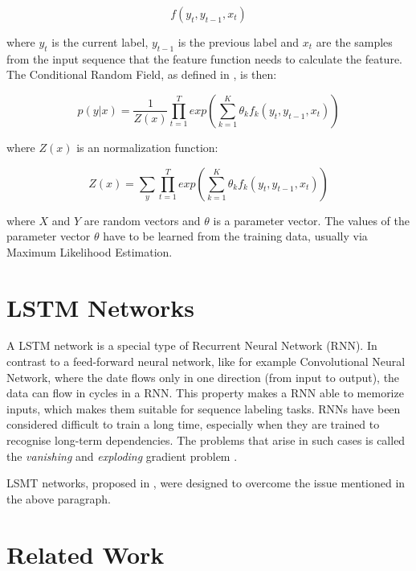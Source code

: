 \documentclass[12pt]{book}
\begin{document}
	\begin{equation}
	f(y_t, y_{t-1}, x_t)
	\end{equation}
	
	where $y_t$ is the current label, $y_{t-1}$ is the previous label and $x_t$ are the samples from the input sequence that the feature function needs to calculate the feature. The Conditional Random Field, as defined in \cite{MAL-013}, is then:
	
	\begin{equation}
	p(y|x) = \frac{1}{Z(x)} \prod_{t=1}^T exp(\sum_{k=1}^{K} \theta_k f_k(y_t, y_{t-1}, x_t))
	\end{equation}
	
	where $Z(x)$ is an normalization function:
	
	\begin{equation}
	Z(x) = \sum_{y} \prod_{t=1}^{T} exp(\sum_{k=1}^{K} \theta_k f_k(y_t, y_{t-1}, x_t))
	\end{equation}
	
	where $X$ and $Y$ are random vectors and $\theta$ is a parameter vector. The values of the parameter vector $\theta$ have to be learned from the training data, usually via Maximum Likelihood Estimation.
	
	\section{LSTM Networks}
	\label{sec:lstm}
	
	A LSTM network is a special type of Recurrent Neural Network (RNN). In contrast to a feed-forward neural network, like for example Convolutional Neural Network, where the date flows only in one direction (from input to output), the data can flow in cycles in a RNN. This property makes a RNN able to memorize inputs, which makes them suitable for sequence labeling tasks.
	RNNs have been considered difficult to train a long time, especially when they are trained to recognise long-term dependencies. The problems that arise in such cases is called the \textit{vanishing} and \textit{exploding} gradient problem \cite{lipton2015critical}.
	
	LSMT networks, proposed in \cite{hochreiter1997long}, were designed to overcome the issue mentioned in the above paragraph.
	
	\section{Related Work}
	\label{sec:relatedwork}
	
\end{document}
